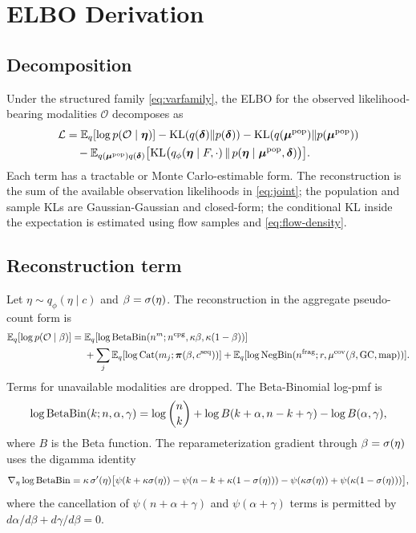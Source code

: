\section{ELBO Derivation}
\label{sec:elbo}

\subsection{Decomposition}
Under the structured family \eqref{eq:varfamily}, the ELBO for the observed likelihood-bearing modalities $\mathcal{O}$ decomposes as
\begin{align}
\mathcal{L} &= \mathbb{E}_q[\log p(\mathcal{O}\mid\bm\eta)]
       - \mathrm{KL}(q(\boldsymbol{\delta})\|p(\boldsymbol{\delta}))
       - \mathrm{KL}(q(\bm{\mu}^{\mathrm{pop}})\|p(\bm{\mu}^{\mathrm{pop}})) \nonumber\\
      &\quad - \mathbb{E}_{q(\bm{\mu}^{\mathrm{pop}})q(\boldsymbol{\delta})}\big[\mathrm{KL}\big(q_\phi(\bm\eta\mid F,\cdot)\,\|\,p(\bm\eta\mid\bm{\mu}^{\mathrm{pop}},\boldsymbol{\delta})\big)\big].
\label{eq:elbo-decomp}
\end{align}
Each term has a tractable or Monte Carlo-estimable form. The reconstruction is the sum of the available observation likelihoods in \eqref{eq:joint}; the population and sample KLs are Gaussian-Gaussian and closed-form; the conditional KL inside the expectation is estimated using flow samples and \eqref{eq:flow-density}.

\subsection{Reconstruction term}
Let $\eta\sim q_\phi(\eta\mid c)$ and $\beta=\sigma(\eta)$. The reconstruction in the aggregate pseudo-count form is
\begin{align}
\mathbb{E}_q[\log p(\mathcal{O}\mid\beta)]
=\;& \mathbb{E}_q[\log\mathrm{BetaBin}(n^m;n^{\mathrm{cpg}},\kappa\beta,\kappa(1-\beta))] \nonumber\\
   &+ \sum_j \mathbb{E}_q[\log\mathrm{Cat}(m_j;\boldsymbol{\pi}(\beta, c^{\mathrm{seq}}))]
    + \mathbb{E}_q[\log\mathrm{NegBin}(n^{\mathrm{frag}};r,\mu^{\mathrm{cov}}(\beta,\mathrm{GC},\mathrm{map}))].
\label{eq:reconstruction}
\end{align}
Terms for unavailable modalities are dropped. The Beta-Binomial log-pmf is
\begin{equation}
\log\mathrm{BetaBin}(k;n,\alpha,\gamma) = \log\binom{n}{k} + \log B(k+\alpha, n-k+\gamma) - \log B(\alpha,\gamma),
\end{equation}
where $B$ is the Beta function. The reparameterization gradient through $\beta=\sigma(\eta)$ uses the digamma identity
\begin{equation}
\nabla_\eta\log\mathrm{BetaBin} = \kappa\,\sigma'(\eta)\big[\psi(k+\kappa\sigma(\eta)) - \psi(n-k+\kappa(1-\sigma(\eta))) - \psi(\kappa\sigma(\eta)) + \psi(\kappa(1-\sigma(\eta)))\big],
\label{eq:bb-grad}
\end{equation}
where the cancellation of $\psi(n+\alpha+\gamma)$ and $\psi(\alpha+\gamma)$ terms is permitted by $d\alpha/d\beta+d\gamma/d\beta=0$.


